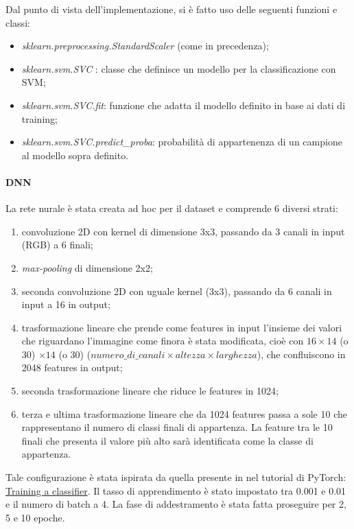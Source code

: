 \documentclass[11pt, a4paper, titlepage]{article}
\begin{document}
\medskip
Dal punto di vista dell'implementazione, si è fatto uso delle seguenti funzioni e classi:
\begin{itemize}
    \item \emph{sklearn.preprocessing.StandardScaler} \cite{scikit-learn} (come in precedenza);
    \item \emph{sklearn.svm.SVC} \cite{scikit-learn}: classe che definisce un modello per la classificazione con SVM;
    \item \emph{sklearn.svm.SVC.fit}: funzione che adatta il modello definito in base ai dati di training;
    \item \emph{sklearn.svm.SVC.predict\_proba}: probabilità di appartenenza di un campione al modello sopra definito.
\end{itemize}

\paragraph{DNN}
La rete nurale è stata creata ad hoc per il dataset e comprende 6 diversi strati:
\begin{enumerate}
    \item convoluzione 2D con kernel di dimensione 3x3, passando da 3 canali in input (RGB) a 6 finali;
    \item \emph{max-pooling} di dimensione 2x2;
    \item seconda convoluzione 2D con uguale kernel (3x3), passando da 6 canali in input a 16 in output;
    \item trasformazione lineare che prende come features in input l'insieme dei valori che riguardano l'immagine come finora è stata modificata, cioè con $16 \times 14$ (o 30) $\times 14$ (o 30) ($numero\_di\_canali \times altezza \times larghezza$), che confluiscono in 2048 features in output;
    \item seconda trasformazione lineare che riduce le features in 1024;
    \item terza e ultima trasformazione lineare che da 1024 features passa a sole 10 che rappresentano il numero di classi finali di appartenza. La feature tra le 10 finali che presenta il valore più alto sarà identificata come la classe di appartenza.
\end{enumerate}
Tale configurazione è stata ispirata da quella presente in nel tutorial di PyTorch: \href{https://pytorch.org/tutorials/beginner/blitz/cifar10_tutorial.html}{Training a classifier}. Il tasso di apprendimento è stato impostato tra 0.001 e 0.01 e il numero di batch a 4. La fase di addestramento è stata fatta proseguire per 2, 5 e 10 epoche. 
\end{document}
